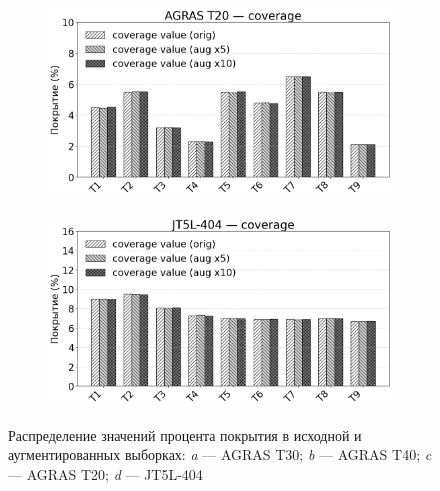 \begin{figure}[htbp]
\begin{minipage}{0.95\linewidth}
\begin{subfigure}[t]{\dimexpr.5\linewidth-1.3em\relax}
		\centering
		\includegraphics[width=.95\linewidth,valign=t]{my_folder/images/augment/droplet_deposition/T20-coverage.png}
	\end{subfigure}%
	\hfill %
	\begin{subfigure}[t]{\dimexpr.5\linewidth-1.3em\relax}
		\centering
		\includegraphics[width=.95\linewidth,valign=t]{my_folder/images/augment/coffee_science/JT5-coverage.png}
	\end{subfigure}
	\end{minipage}
	\captionsetup{justification=centering} %
	\caption{Распределение значений процента покрытия в исходной и аугментированных выборках: {\itshape a} --- AGRAS T30; {\itshape b} --- AGRAS T40; {\itshape c} --- AGRAS T20; {\itshape d} --- JT5L-404} 
	\label{fig:augment-coverage}
\end{figure}
